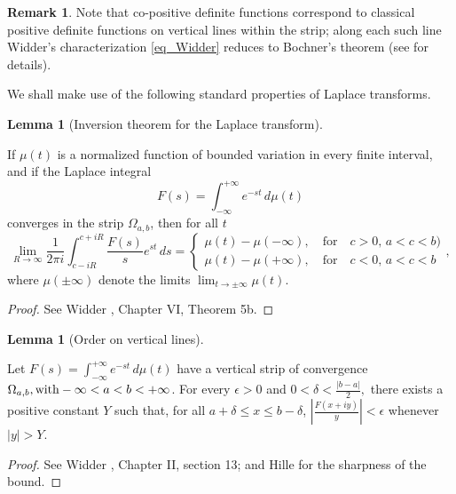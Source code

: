\documentclass[12pt]{article}
\theoremstyle{definition}
\newtheorem{lemma}[theorem]{Lemma}
\newtheorem{remark}[theorem]{Remark}
\begin{document}
\begin{remark}

Note that co-positive definite functions correspond to classical positive definite functions on vertical lines within the strip; along each such line Widder's characterization \eqref{eq_Widder} reduces to Bochner's theorem (see \cite{Reed} for details). 
    
\end{remark}


We shall make  use of the following standard properties of Laplace transforms. 

\begin{lemma}[Inversion theorem for the Laplace transform]\label{lem:inv}


     If $\mu(t)$ is a normalized function of bounded variation in every finite interval, and if the Laplace integral \[ F(s)= \int_{- \infty} ^{+ \infty} e^{-st} \, d\mu(t)\] converges in the strip $\Omega_{a,b}$, then for all $t$ 
     \begin{equation} \label{eq:inv}
        \lim_{R \to \infty} \frac{1}{2 \pi i} \int_{c-iR}^{c+ iR} \frac{F(s)}{s}e^{st} \,ds = \begin{cases} \mu(t)-\mu(- \infty), \quad \text{for} \quad  c>0, \,  a<c<b) \\
        \mu(t)-\mu(+\infty), \quad \text{for} \quad  c<0, \, a<c<b
        \end{cases},
    \end{equation}
    where \( \mu(\pm \infty)\) denote the limits \( \lim_{t \to \pm \infty} \mu(t).\)
 \end{lemma}

 \begin{proof}
     See Widder \cite{Widder}, Chapter VI, Theorem 5b.
 \end{proof}

 \begin{lemma}[Order on vertical lines]
 \label{lem:order}

 Let $F(s)=\int_{-\infty}^{+ \infty}e^{-st} \,d\mu(t)$ have a vertical strip of convergence $\Omega_{a,b}, {\rm with}  - \infty < a<b < + \infty$. For every $\epsilon>0$ and $0<\delta<\frac{|b-a|}{2},$ there exists a positive constant $Y$ such that, for all $a+ \delta \leq x \leq b- \delta$, 
 $\displaystyle{\left| \frac{F(x+iy)}{y}\right|< \epsilon}$
whenever $|y|>Y.$
   
\end{lemma}
\begin{proof}
    See Widder \cite{Widder}, Chapter II, section 13; and Hille \cite{HilleExtremal} for the sharpness of the bound.
\end{proof}
\end{document}
